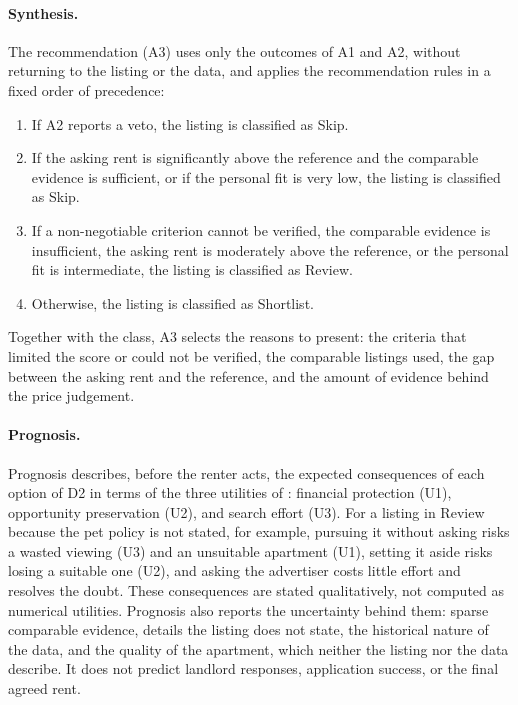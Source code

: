 \documentclass[12pt,a4paper]{report}
\begin{document}
\paragraph{Synthesis.} The recommendation (A3) uses only the outcomes of A1
and A2, without returning to the listing or the data, and applies the
recommendation rules in a fixed order of precedence:

\begin{enumerate}[leftmargin=*]
  \item If A2 reports a veto, the listing is classified as Skip.
  \item If the asking rent is significantly above the reference and the
  comparable evidence is sufficient, or if the personal fit is very low,
  the listing is classified as Skip.
  \item If a non-negotiable criterion cannot be verified, the comparable
  evidence is insufficient, the asking rent is moderately above the
  reference, or the personal fit is intermediate, the listing is classified
  as Review.
  \item Otherwise, the listing is classified as Shortlist.
\end{enumerate}

Together with the class, A3 selects the reasons to present: the criteria
that limited the score or could not be verified, the comparable listings
used, the gap between the asking rent and the reference, and the amount of
evidence behind the price judgement.

\paragraph{Prognosis.} Prognosis describes, before the renter acts, the
expected consequences of each option of D2 in terms of the three utilities
of : financial protection (U1), opportunity preservation
(U2), and search effort (U3). For a listing in Review because the pet policy
is not stated, for example, pursuing it without asking risks a wasted
viewing (U3) and an unsuitable apartment (U1), setting it aside risks
losing a suitable one (U2), and asking the advertiser costs little effort
and resolves the doubt. These consequences are stated qualitatively, not
computed as numerical utilities. Prognosis also reports the uncertainty
behind them: sparse comparable evidence, details the listing does not
state, the historical nature of the data, and the quality of the apartment,
which neither the listing nor the data describe. It does not predict
landlord responses, application success, or the final agreed rent.
\end{document}
